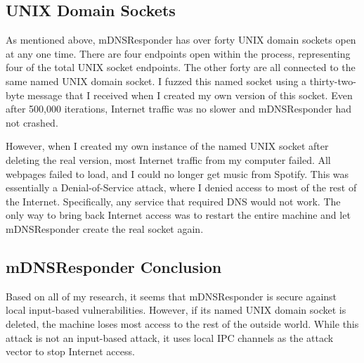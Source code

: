 \subsection{UNIX Domain Sockets}
\label{sec:mdnsUnix}
As mentioned above, mDNSResponder has over forty UNIX domain sockets open at any one time.  There are four endpoints open within the process, representing four of the total UNIX socket endpoints.  The other forty are all connected to the same named UNIX domain socket.  I fuzzed this named socket using a thirty-two-byte message that I received when I created my own version of this socket.  Even after 500,000 iterations, Internet traffic was no slower and mDNSResponder had not crashed.

However, when I created my own instance of the named UNIX socket after deleting the real version, most Internet traffic from my computer failed.  All webpages failed to load, and I could no longer get music from Spotify.  This was essentially a Denial-of-Service attack, where I denied access to most of the rest of the Internet.  Specifically, any service that required DNS would not work.  The only way to bring back Internet access was to restart the entire machine and let mDNSResponder create the real socket again.

\subsection{mDNSResponder Conclusion}
\label{sec:mdnsConclusion}
Based on all of my research, it seems that mDNSResponder is secure against local input-based vulnerabilities.  However, if its named UNIX domain socket is deleted, the machine loses most access to the rest of the outside world.  While this attack is not an input-based attack, it uses local IPC channels as the attack vector to stop Internet access.
